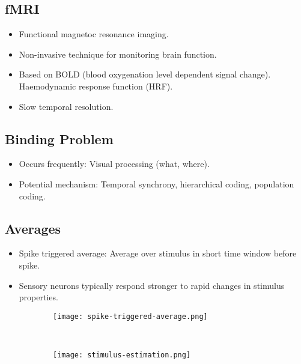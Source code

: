 \documentclass[main]{subfiles}
\begin{document}
\subsection{fMRI}
\begin{itemize}[noitemsep,nolistsep]
	\item Functional magnetoc resonance imaging.
	\item Non-invasive technique for monitoring brain function.
	\item Based on BOLD (blood oxygenation level dependent signal change). Haemodynamic response function (HRF).
	\item Slow temporal resolution.
\end{itemize}

\subsection{Binding Problem}
\begin{itemize}[noitemsep,nolistsep]
	\item Occurs frequently: Visual processing (what, where).
	\item Potential mechanism: Temporal synchrony, hierarchical coding, population coding.
\end{itemize}

\subsection{Averages}
\begin{itemize}[noitemsep,nolistsep]
	\item Spike triggered average: Average over stimulus in short time window before spike.
	\item Sensory neurons typically respond stronger to rapid changes in stimulus properties.
\end{itemize}
\begin{figure}[H]
	\centering
	\begin{subfigure}[b]{0.5\textwidth}
		\centering
		\texttt{[image: spike-triggered-average.png]}
	\end{subfigure}%
	~
	\begin{subfigure}[b]{0.5\textwidth}
		\centering
		\texttt{[image: stimulus-estimation.png]}
	\end{subfigure}
\end{figure}
\end{document}
